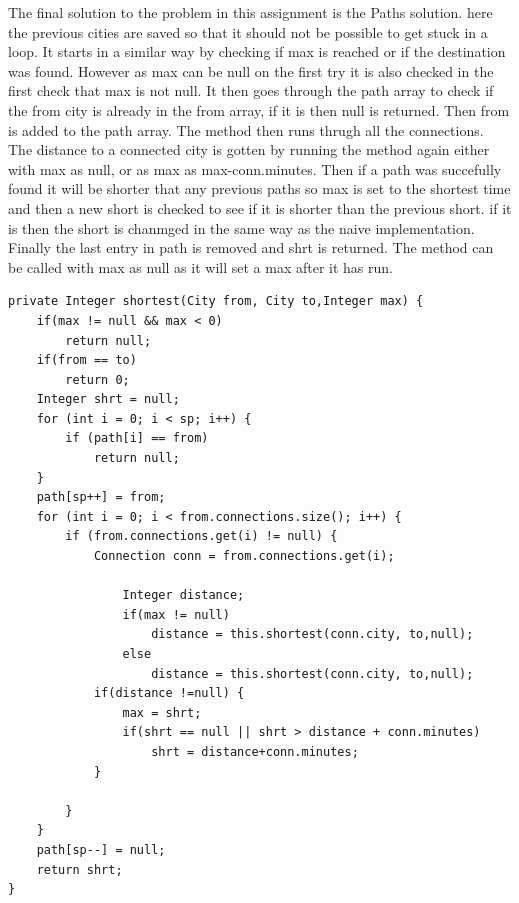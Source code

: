 \documentclass[a4paper,11pt]{article}
\begin{document}
The final solution to the problem in this assignment is the Paths solution. here the previous cities are saved so that it should not be possible to get stuck in a loop. 
It starts in a similar way by checking if max is reached or if the destination was found. However as max can be null on the first try it is also checked in the first check that max is not null. 
It then goes through the path array to check if the from city is already in the from array, if it is then null is returned. 
Then from is added to the path array. The method then runs thrugh all the connections. The distance to a connected city is gotten by running the method again either with max as null, or as max as max-conn.minutes. Then if a path was succefully found it will be shorter that any previous paths so max is set to the shortest time and then a new short is checked to see if it is shorter than the previous short. if it is then the short is chanmged in the same way 
as the naive implementation. Finally the last entry in path is removed and shrt is returned. The method can be called with max as null as it will set a max after it has run.

\begin{verbatim}
private Integer shortest(City from, City to,Integer max) {
    if(max != null && max < 0)
        return null;
    if(from == to)
        return 0;
    Integer shrt = null;
    for (int i = 0; i < sp; i++) {
        if (path[i] == from)
            return null;
    }
    path[sp++] = from;
    for (int i = 0; i < from.connections.size(); i++) {
        if (from.connections.get(i) != null) {
            Connection conn = from.connections.get(i);

                Integer distance;
                if(max != null)
                    distance = this.shortest(conn.city, to,null);
                else 
                    distance = this.shortest(conn.city, to,null);
            if(distance !=null) {
                max = shrt;
                if(shrt == null || shrt > distance + conn.minutes)
                    shrt = distance+conn.minutes;
            }
            
        }
    }
    path[sp--] = null;
    return shrt;
}
\end{verbatim}
\end{document}

